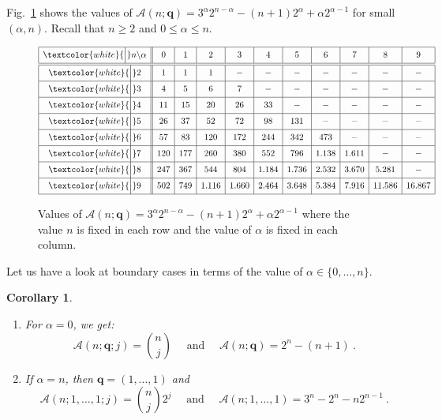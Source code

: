 \documentclass[letter,11pt]{amsart}
\newcommand{\q}{\boldsymbol{q}}
\theoremstyle{theorem}
\newtheorem{cor}[Thm]{Corollary}
\theoremstyle{definition}
\numberwithin{equation}{section}
\begin{document}
Fig.~\ref{Fig:Table}
shows the values of 
$  \mathcal{A} (n;\q) 
= 
3^\alpha 2^{n-\alpha} - ( n + 1) 2^{\alpha} + \alpha 2^{\alpha - 1} $
for small $ (\alpha, n) $.
Recall that $ n \geq 2 $ and $ 0 \leq \alpha \leq n $.  
 
 
 \begin{figure}
\[
\begin{array}{|c||c|c|c|c|c|c|c|c|c|c|c|}
	\hline 
	\textcolor{white}{\Big|}
	n \backslash \alpha
	& 0 & 1 & 2 & 3 & 4 & 5 & 6 & 7 & 8 & 9 %
	\\
	\hline \hline 
	\textcolor{white}{\Big|}
	2
	& 1 & 1 & 1 & - & - & - & - & - & - & - %
	\\
	\hline 
	\textcolor{white}{\Big|}
	3
	& 4 & 5 & 6 & 7 &  - & - & - & - & - & - %
	\\
	\hline 
	\textcolor{white}{\Big|}
	4
	& 11 & 15 & 20 & 26 & 33 &  - & - & - & - & - %
	\\
	\hline 
	\textcolor{white}{\Big|}
	5
	& 26 & 37 & 52 & 72 & 98 &  131 & - & - & - & - %
	\\
	\hline 
	\textcolor{white}{\Big|}
	6
	& 57 & 83 & 120 & 172 & 244 & 342 & 473 & - & - & - %
	\\
	\hline 
	\textcolor{white}{\Big|}
	7
	& 120 & 177 & 260 & 380 & 552 & 796 & 1.138 & 1.611 & -& -%
	\\
	\hline 
	\textcolor{white}{\Big|}
	8
	& 247 & 367 & 544 & 804 & 1.184 & 1.736 & 2.532 & 3.670 & 5.281 & - %
	\\
	\hline 
	\textcolor{white}{\Big|}
	9
	& 502 & 749 & 1.116 & 1.660 & 2.464 & 3.648 & 5.384 & 7.916 & 11.586 & 16.867 %
	\\
	\hline 
	\end{array}
\]
\caption{Values of 
	$  \mathcal{A} (n;\q) 
	= 
	3^\alpha 2^{n-\alpha} - ( n + 1) 2^{\alpha} + \alpha 2^{\alpha - 1} $ 
	where the value $ n $ is fixed in each row
	and the value of $ \alpha $ is fixed in each column. \label{Fig:Table}} 	
\end{figure}



Let us have a look at boundary cases in terms of the value of $ \alpha \in \{ 0, \ldots, n \} $.

\begin{cor}
	\label{cor:bondary}
	\begin{enumerate}[(1)]
		\item 
		For $ \alpha = 0 $,
		we get:
		\[  
		\mathcal{A} (n;\q; j) = \binom{n}{j}
		\quad 
		\mbox{ and }
		\quad   
		\mathcal{A} (n;\q) = 2^n - ( n + 1 ) \ .
		\] 
		
		\item 
		If $ \alpha = n $,
		then $ \q = (1,\ldots, 1) $ and
		\[  
		\mathcal{A} (n;1,\ldots, 1; j) = 		 \binom{n}{j} 2^{j}
		\quad 
		\mbox{ and }
		\quad   
		\mathcal{A} (n;1,\ldots, 1) = 
		3^n  - 2^{n}
		- n 2^{n - 1} 
		\ .
		\]  
	\end{enumerate}
\end{cor}
\end{document}
